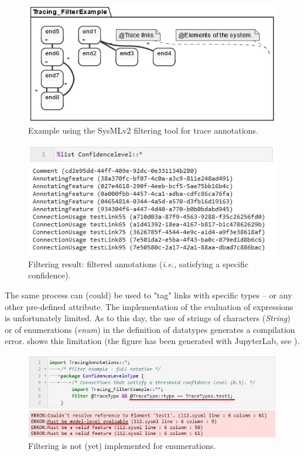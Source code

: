 \begin{figure}[ht]     
	\centering
	\includegraphics[width=.9\linewidth]{images/viz_filterexample.JPG}
	\caption{Example using the SysMLv2 filtering tool for trace annotations.}
	\label{fig:vizfilter}
\end{figure} 

\begin{figure}[ht]     
	\centering
	\includegraphics[width=.75\linewidth]{images/viz_filterexample_res.JPG}
	\caption{Filtering result: filtered annotations (\textit{i.e.,} satisfying a specific confidence).}
	\label{fig:vizfilterres}
\end{figure} 



The same process can (could) be used to "tag" links with specific types -- or any other pre-defined attribute. The implementation of the evaluation of expressions is unfortunately limited. As to this day, the use of strings of characters (\textit{String}) or of enumerations (\textit{enum}) in the definition of datatypes generates a compilation error.  shows this limitation (the figure has been generated with JupyterLab, see ).

\begin{figure}[ht]     
	\centering
	\includegraphics[width=.9\linewidth]{images/viz_filterexample_err.JPG}
	\caption{Filtering is not (yet) implemented for enumerations.}
	\label{fig:vizfiltererr}
\end{figure} 
